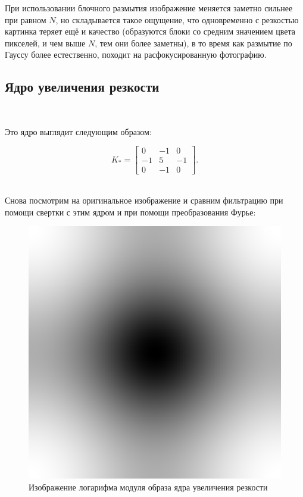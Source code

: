 \documentclass[a4paper]{article}
\begin{document}
При использовании блочного размытия изображение меняется заметно сильнее при равном $N$, но складывается такое ощущение, что одновременно с резкостью картинка теряет ещё и качество (образуются блоки со средним значением цвета пикселей, и чем выше $N$, тем они более заметны), в то время как размытие по Гауссу более естественно, походит на расфокусированную фотографию.

\subsection{Ядро увеличения резкости}\ 

Это ядро выглядит следующим образом:

$$
K_* = \begin{bmatrix}
    0 & -1 & 0 \\ 
    -1 & 5 & -1 \\ 
    0 & -1 & 0
\end{bmatrix}.
$$\

Снова посмотрим на оригинальное изображение и сравним фильтрацию при помощи свертки с этим ядром и при помощи преобразования Фурье:

\begin{figure}[H]
    \centering
    \includegraphics[width=0.45\linewidth]{2/abs_fourier_log_norm_sharpen.png}
    \caption{Изображение логарифма модуля образа ядра увеличения резкости}
\end{figure}\noindent
\end{document}
